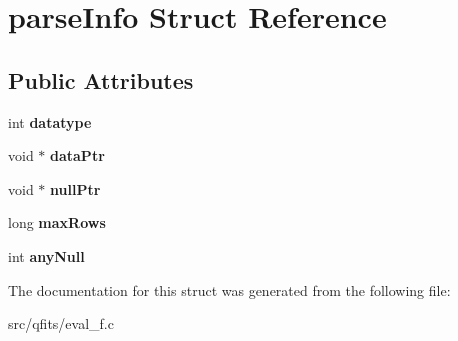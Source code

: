 \hypertarget{structparse_info}{}\section{parse\+Info Struct Reference}
\label{structparse_info}
\subsection*{Public Attributes}
\begin{DoxyCompactItemize}
\item 
\mbox{\label{structparse_info_a160b7a25449a5ef7e7ca6f4f11a66114}} 
int {\bfseries datatype}
\item 
\mbox{\label{structparse_info_a46a1fec6a4a81a94d21ba69e1c8a474a}} 
void $\ast$ {\bfseries data\+Ptr}
\item 
\mbox{\label{structparse_info_a8f46e61d320ee73d878efea1cae1375b}} 
void $\ast$ {\bfseries null\+Ptr}
\item 
\mbox{\label{structparse_info_a7081aef83e598c825ff8752186944efd}} 
long {\bfseries max\+Rows}
\item 
\mbox{\label{structparse_info_abca01dc6b045ec9bc10cd53aaaf502f3}} 
int {\bfseries any\+Null}
\end{DoxyCompactItemize}


The documentation for this struct was generated from the following file\+:\begin{DoxyCompactItemize}
\item 
src/qfits/eval\+\_\+f.\+c\end{DoxyCompactItemize}
